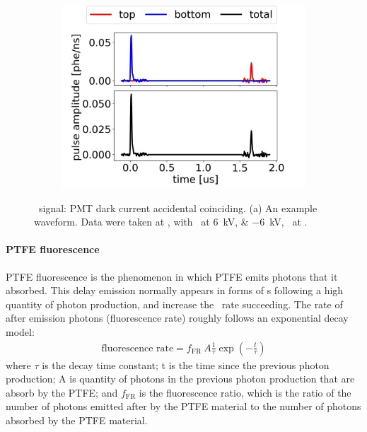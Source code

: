 \begin{figure}[!p]
	\centering
	\begin{subfigure}[b]{0.7\textwidth}
		\centering
		\includegraphics[width=\figurewidth,clip,trim={0 0 0 0}]{Figures/GasTest/exampleWaveforms/proc64767id00000053.jpg}%
		\caption{}
		\label{fig:}
	\end{subfigure}
	\caption[\gtest\ signal: PMT dark current accidental coinciding.]{\gtest\ signal: PMT dark current accidental coinciding. (a) An example waveform. Data were taken at , with \opvtvb\ at \SIlist{+6;-6}{kV}, \opgd\ at \standarddensity .%
	}
	\label{fig:pmt dark current}
\end{figure}


\paragraph{PTFE fluorescence}
\label{sec:events PTFE fluo}
PTFE fluorescence is the phenomenon in which PTFE emits photons that it absorbed. This delay emission normally appears in forms of \sphe s following a high quantity of photon production, and increase the \sphe\ rate succeeding. The rate of after emission photons (fluorescence rate) roughly follows an exponential decay model:
\begin{align}
	 \text{fluorescence rate} = f_{\text{FR}}\ A\frac{1}{\tau} \exp \left( -\frac{t}{\tau} \right) 
\end{align} 
where $\tau$ is the decay time constant; t is the time since the previous photon production; A is quantity of photons in the previous photon production that are absorb by the PTFE; and $f_{\text{FR}}$ is the fluorescence ratio, which is the ratio of the number of photons emitted after by the PTFE material to the number of photons absorbed by the PTFE material.

